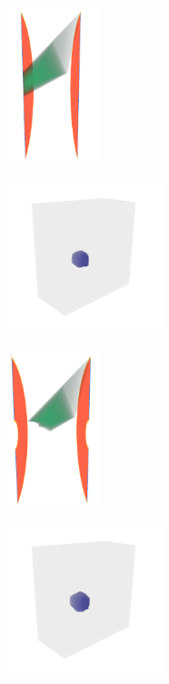 \documentclass[a4paper,fontsize=12pt,toc=bib,halfparskip]{scrartcl}
\begin{document}
\begin{figure}
	\begin{subfigure}{0.49\textwidth}
		\centering
		\includegraphics[height=4.5cm]{pictures/results/SinglePoint_InvariantSpace1.png}
		\subcaption{}
		\label{SinglePointInvariant1}
	\end{subfigure}
	\hspace*{\fill}
	\begin{subfigure}{0.49\textwidth}
		\centering
		\includegraphics[height=4.5cm]{pictures/results/SinglePoint_Object1.png}
		\subcaption{}
		\label{SinglePointObject1}
	\end{subfigure}
	\medskip
	\begin{subfigure}{0.49\textwidth}
		\centering
		\includegraphics[height=4.5cm]{pictures/results/SinglePoint_InvariantSpace2.png}
		\subcaption{}
		\label{SinglePointInvariant2}
	\end{subfigure}
	\hspace*{\fill}
	\begin{subfigure}{0.49\textwidth}
		\centering
		\includegraphics[height=4.5cm]{pictures/results/SinglePoint_Object2.png}

\end{subfigure}
\end{figure}
\end{document}
